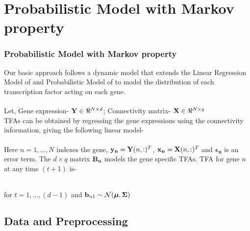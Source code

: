 \documentclass{beamer}
\begin{document}
\section{Probabilistic Model with Markov property}
\begin{frame}
\frametitle{Probabilistic Model with Markov property}
Our basic approach follows a dynamic model that extends the 
{\color{green} Linear Regression Model} of  \cite{p1}  and 
{\color{blue} Probabilistic Model} of  \cite{p2} to model the distribution of each transcription factor acting on each gene.\\~\\

Let, Gene expression- $ \bold{Y} \in \Re^{N \times d} $;  
Connectivity matrix- $ \bold{X} \in \Re^{N \times q} $ \\
TFAs can be obtained by regressing the gene expressions using the connectivity information, giving the following linear model- \\
 \\

Here $n = 1, . . . ,N$ indexes the gene, $ \bold{y_{n}} = \bold{Y}(n,:)^T $, $ \bold{x_{n}} = \bold{X}(n,:)^T $ and  $ \boldsymbol{\epsilon_{n}} $ is an error term. The ${d \times q}$ matrix $ \bold{B_{n}} $ models the gene specific TFAs. TFA for gene $n$ at any time $(t+1)$ is-

 \\
for $ t= 1, ... , (d-1)$ and $ \bold{b}_{n1} \sim \mathcal{N} ( \boldsymbol{\mu},\boldsymbol{\Sigma})$

\end{frame}


\subsection{Data and Preprocessing}

\end{document}

